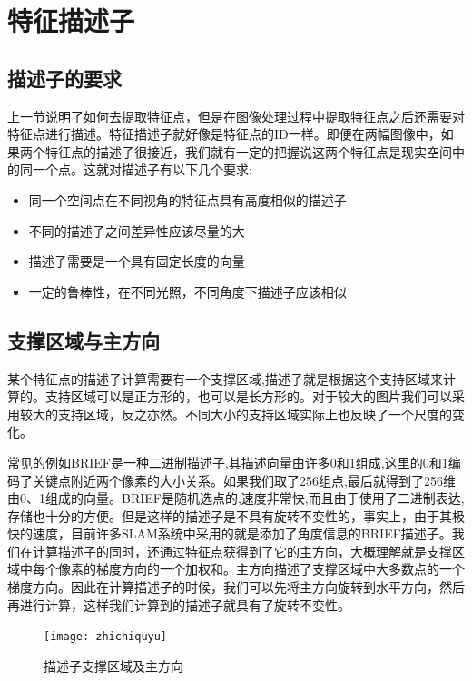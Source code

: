 \section{特征描述子}
\subsection{描述子的要求}
上一节说明了如何去提取特征点，但是在图像处理过程中提取特征点之后还需要对特征点进行描述。特征描述子就好像是特征点的ID一样。即便在两幅图像中，如果两个特征点的描述子很接近，我们就有一定的把握说这两个特征点是现实空间中的同一个点。这就对描述子有以下几个要求:
\begin{itemize}
	\item 同一个空间点在不同视角的特征点具有高度相似的描述子
	\item 不同的描述子之间差异性应该尽量的大
	\item 描述子需要是一个具有固定长度的向量
	\item 一定的鲁棒性，在不同光照，不同角度下描述子应该相似
\end{itemize}
\subsection{支撑区域与主方向}
某个特征点的描述子计算需要有一个支撑区域,描述子就是根据这个支持区域来计算的。支持区域可以是正方形的，也可以是长方形的。对于较大的图片我们可以采用较大的支持区域，反之亦然。不同大小的支持区域实际上也反映了一个尺度的变化。\par
常见的例如BRIEF是一种二进制描述子,其描述向量由许多0和1组成,这里的0和1编码了关键点附近两个像素的大小关系。如果我们取了256组点,最后就得到了256维由0、1组成的向量。BRIEF是随机选点的,速度非常快,而且由于使用了二进制表达,存储也十分的方便。但是这样的描述子是不具有旋转不变性的，事实上，由于其极快的速度，目前许多SLAM系统中采用的就是添加了角度信息的BRIEF描述子。我们在计算描述子的同时，还通过特征点获得到了它的主方向，大概理解就是支撑区域中每个像素的梯度方向的一个加权和。主方向描述了支撑区域中大多数点的一个梯度方向。因此在计算描述子的时候，我们可以先将主方向旋转到水平方向，然后再进行计算，这样我们计算到的描述子就具有了旋转不变性。
\begin{figure}[H]
	\centering
	\texttt{[image: zhichiquyu]}
	\caption{描述子支撑区域及主方向}
\end{figure}
